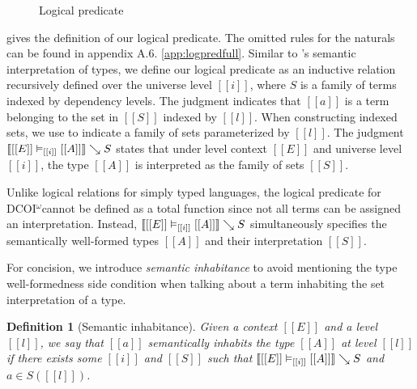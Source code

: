 \documentclass[acmsmall]{acmart}
\makeatletter
\theoremstyle{linked}
\theoremstyle{deflinked}
\theoremstyle{acmdefinition}
\newtheorem{nolinkdef}[thm]{Definition}
\DeclarePairedDelimiter{\bracks}{\llbracket}{\rrbracket}
\DeclarePairedDelimiter{\braces}{\lbrace}{\rbrace}
\newcommand{\name}{\texorpdfstring{DCOI$^{\omega}$\@\xspace}{DCOI-omega}}
\newcommand{\judgement}[1]{{\setlength{\fboxsep}{1.5pt}\fbox{#1}}}
\newcommand{\interp}[4]{\bracks{#1 \vDash_{#2} #3} \searrow #4}
\newcommand{\interpU}[3]{\bracks{#1 \vDash_{#2} #3}}
\newcommand{\buildset}[3]{#2 . \braces{#1 \mid #3}}
\newcommand{\member}[3]{#1 \in #3(#2)}
\newcommand{\sigspace}[5]{#1 \in \hat{\Sigma}(#2^{#3}, #4^{#5})}
\makeatother
\begin{document}
\begin{figure}[h]
  \caption{Logical predicate}
  \Description{}
  \label{fig:logpred}
\end{figure}

 gives the definition of our logical
predicate. The omitted rules for the naturals can be
found in
\ifpublic appendix A.6.
\else \cref{app:logpredfull}.
\fi
Similar to \citet{abel:irrelevance}'s semantic interpretation of types,
we define our logical predicate \judgement{$\interp{[[E]]}{[[i]]}{[[A]]}{S}$}
as an inductive relation recursively defined over the universe level $[[i]]$,
where $S$ is a family of terms indexed by dependency levels.
The judgment \judgement{$\member{a}{[[l]]}{S}$} indicates that $[[a]]$ is
a term belonging to the set in $[[S]]$ indexed by $[[l]]$.
When constructing indexed sets, we use
\judgement{$\buildset{[[a]]}{[[l]]}{\ldots}$} to indicate a family of sets
parameterized by $[[l]]$.
The judgment $\interp{[[E]]}{[[i]]}{[[A]]}{S}$ states that under
level context $[[E]]$ and universe level $[[i]]$, the type $[[A]]$
is interpreted as the family of sets $[[S]]$.

\ifextended
Unlike logical relations for simply typed languages, the logical
predicate for \name cannot be defined as a total function since not
all terms can be assigned an interpretation. Instead,
\mbox{$\interp{[[E]]}{[[i]]}{[[A]]}{S}$} simultaneously specifies the
semantically well-formed types $[[A]]$ and their interpretation $[[S]]$.
\fi

For concision, we introduce \emph{semantic inhabitance} to
avoid mentioning the type well-formedness side condition
when talking about a term inhabiting the set interpretation of a type.

\begin{nolinkdef}[Semantic inhabitance]
  Given a context $[[E]]$ and a level $[[l]]$,
  we say that $[[a]]$ \emph{semantically inhabits} the type $[[A]]$
  at level $[[l]]$ if there exists some $[[i]]$ and $[[S]]$ such that
  $\interp{[[E]]}{[[i]]}{[[A]]}{S}$ and $\member{a}{[[l]]}{S}$.
\end{nolinkdef}
\end{document}
